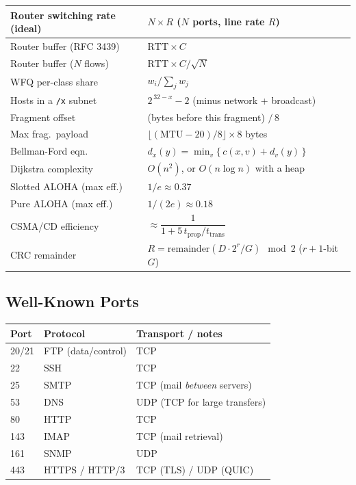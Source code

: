 \documentclass[hidelinks]{article}
\begin{document}
\begin{tabularx}{\textwidth}{|l|X|}
\hline
Router switching rate (ideal) & $N \times R$ \; ($N$ ports, line rate $R$) \\
\hline
Router buffer (RFC 3439) & $\text{RTT} \times C$ \\
\hline
Router buffer ($N$ flows) & $\text{RTT} \times C / \sqrt{N}$ \\
\hline
WFQ per-class share & $w_i / \textstyle\sum_j w_j$ \\
\hline
Hosts in a \texttt{/x} subnet & $2^{\,32-x} - 2$ \; (minus network + broadcast) \\
\hline
Fragment offset & (bytes before this fragment) $/\,8$ \\
\hline
Max frag.\ payload & $\lfloor (\text{MTU} - 20)/8 \rfloor \times 8$ bytes \\
\hline
Bellman-Ford eqn.\ & $d_x(y) = \min_v\{\,c(x,v) + d_v(y)\,\}$ \\
\hline
Dijkstra complexity & $O(n^2)$, or $O(n\log n)$ with a heap \\
\hline
Slotted ALOHA (max eff.) & $1/e \approx 0.37$ \\
\hline
Pure ALOHA (max eff.) & $1/(2e) \approx 0.18$ \\
\hline
CSMA/CD efficiency & $\approx \dfrac{1}{1 + 5\,t_{\text{prop}}/t_{\text{trans}}}$ \\
\hline
CRC remainder & $R = \text{remainder}(D\!\cdot\!2^{r} / G)\ \bmod 2$ \; ($r{+}1$-bit $G$) \\
\hline
\end{tabularx}

\subsection{Well-Known Ports}

\noindent\begin{tabularx}{\textwidth}{|l|l|X|}
\hline
\textbf{Port} & \textbf{Protocol} & \textbf{Transport / notes} \\
\hline
20/21 & FTP (data/control) & TCP \\
\hline
22 & SSH & TCP \\
\hline
25 & SMTP & TCP (mail \emph{between} servers) \\
\hline
53 & DNS & UDP (TCP for large transfers) \\
\hline
80 & HTTP & TCP \\
\hline
143 & IMAP & TCP (mail retrieval) \\
\hline
161 & SNMP & UDP \\
\hline
443 & HTTPS / HTTP/3 & TCP (TLS) / UDP (QUIC) \\
\hline
\end{tabularx}
\end{document}
